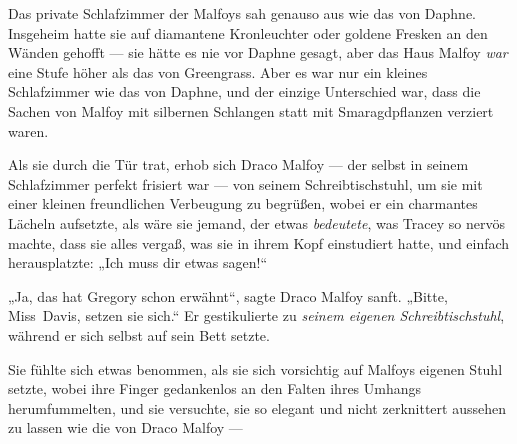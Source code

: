 Das private Schlafzimmer der Malfoys sah genauso aus wie das von Daphne. Insgeheim hatte sie auf diamantene Kronleuchter oder goldene Fresken an den Wänden gehofft — sie hätte es nie vor Daphne gesagt, aber das Haus Malfoy \emph{war} eine Stufe höher als das von Greengrass. Aber es war nur ein kleines Schlafzimmer wie das von Daphne, und der einzige Unterschied war, dass die Sachen von Malfoy mit silbernen Schlangen statt mit Smaragdpflanzen verziert waren.

Als sie durch die Tür trat, erhob sich Draco Malfoy — der selbst in seinem Schlafzimmer perfekt frisiert war — von seinem Schreibtischstuhl, um sie mit einer kleinen freundlichen Verbeugung zu begrüßen, wobei er ein charmantes Lächeln aufsetzte, als wäre sie jemand, der etwas \emph{bedeutete}, was Tracey so nervös machte, dass sie alles vergaß, was sie in ihrem Kopf einstudiert hatte, und einfach herausplatzte:
„Ich muss dir etwas sagen!“

„Ja, das hat Gregory schon erwähnt“, sagte Draco Malfoy sanft.
„Bitte, Miss~Davis, setzen sie sich.“ Er gestikulierte zu \emph{seinem eigenen Schreibtischstuhl}, während er sich selbst auf sein Bett setzte.

Sie fühlte sich etwas benommen, als sie sich vorsichtig auf Malfoys eigenen Stuhl setzte, wobei ihre Finger gedankenlos an den Falten ihres Umhangs herumfummelten, und sie versuchte, sie so elegant und nicht zerknittert aussehen zu lassen wie die von Draco Malfoy —

